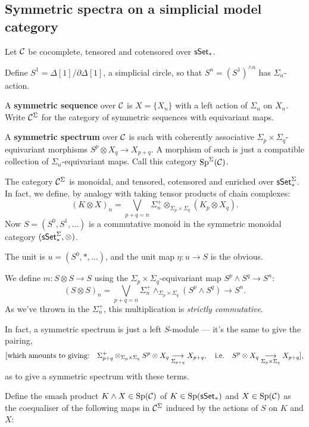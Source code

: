\documentclass[11pt]{article}
\begin{document}
\begin{MichaelStableModelCats}
\subsection*{Symmetric spectra on a simplicial model category}
\begin{itemise}
\item Let $\calC$ be cocomplete, tensored and cotensored over $\sSet_*$.
\item Define $S^1=\Delta[1]/\partial\Delta[1]$, a simplicial circle, so that $S^n=(S^1)^{\wedge n}$ has $\Sigma_n$-action.
\item A \textbf{symmetric sequence} over $\calC$ is $X=\{X_n\}$ with a left action of $\Sigma_n$ on $X_n$. Write $\calC^\Sigma$ for the category of symmetric sequences with equivariant maps.
\item A \textbf{symmetric spectrum} over $\calC$ is such with coherently associative $\Sigma_p\times\Sigma_q$-equivariant morphisms $S^p\otimes X_q\to X_{p+q}$. A morphism of such is just a compatible collection of $\Sigma_n$-equivariant maps. Call this category $\Sp^\Sigma(\calC)$.
\item The category $\calC^\Sigma$ is monoidal, and tensored, cotensored and enriched over $\sSet_*^\Sigma$. In fact, we define, by analogy with taking tensor products of chain complexes:
\[(K\otimes X)_n=\bigvee_{p+q=n}\Sigma_n^+\otimes_{\Sigma_p\times\Sigma_q}(K_p\otimes X_q).\]
Now $S=(S^0,S^1,\ldots)$ is a commutative monoid in the symmetric monoidal category $(\sSet_*^\Sigma,\otimes)$.
\begin{itemise}
\item The unit is $u=(S^0,*,\ldots)$, and the unit map $\eta:u\to S$ is the obvious. 
\item We define $m:S\otimes S\to S$   using the $\Sigma_p\times\Sigma_q$-equivariant map $S^p\wedge S^q\to S^n$:
\[(S\otimes S)_n=\bigvee_{p+q=n}\Sigma_n^+\wedge_{\Sigma_p\times\Sigma_q}(S^p\wedge S^q)\to S^n.\]
As we've thrown in the $\Sigma_n^+$, this multiplication is \emph{strictly commutative}.
\end{itemise}
\item In fact, a symmetric spectrum is just a left $S$-module --- it's the same to give the pairing, 
\[\text{[which amounts to giving:\quad}\Sigma_{p+q}^+\otimes_{\Sigma_p\times\Sigma_q} S^p\otimes X_q\underset{\Sigma_{p+q}}{\to} X_{p+q},\quad\text{i.e.}\quad S^p\otimes X_q\underset{\Sigma_p\times\Sigma_q}{\to} X_{p+q}\text{]},\]
as to give a symmetric spectrum with these terms.
\item Define the smash product  $K\wedge X\in\Sp(\calC)$ of $K\in \Sp(\sSet_*)$ and $X\in \Sp(\calC)$ as the coequaliser of the following maps in $\calC^\Sigma$ induced by the actions of $S$ on $K$ and $X$:

\end{itemise}
\end{MichaelStableModelCats}
\end{document}
